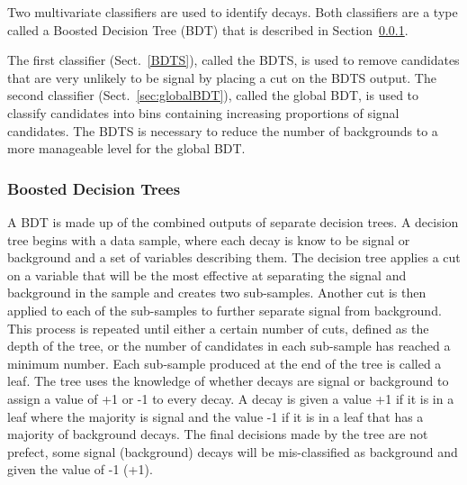 Two multivariate classifiers are used to identify \bsmumu decays. Both classifiers are a type called a Boosted Decision Tree (BDT) that is described in Section~\ref{sec:GeneralBDT}. %

The first classifier (Sect.~\ref{BDTS}), called the BDTS, is used to remove candidates that are very unlikely to be signal by placing a cut on the BDTS output. %
The second classifier (Sect.~\ref{sec:globalBDT}), called the global BDT, is used to classify candidates into bins containing increasing proportions of signal candidates. %
The BDTS is necessary to reduce the number of backgrounds to a more manageable level for the global BDT.

\subsubsection{Boosted Decision Trees}
\label{sec:GeneralBDT}
A BDT is made up of the combined outputs of separate decision trees. A decision tree begins with a data sample, where each decay is know to be signal or background and a set of variables describing them. The decision tree applies a cut on a variable that will be the most effective at separating the signal and background in the sample and creates two sub-samples. Another cut is then applied to each of the sub-samples to further separate signal from background. This process is repeated until either a certain number of cuts, defined as the depth of the tree, or the number of candidates in each sub-sample has reached a minimum number. Each sub-sample produced at the end of the tree is called a leaf. The tree uses the knowledge of whether decays are signal or background to assign a value of +1 or -1 to every decay. A decay is given a value +1 if it is in a leaf where the majority is signal and the value -1 if it is in a leaf that has a majority of background decays. The final decisions made by the tree are not prefect, some signal (background) decays will be mis-classified as background and given the value of -1 (+1). %

